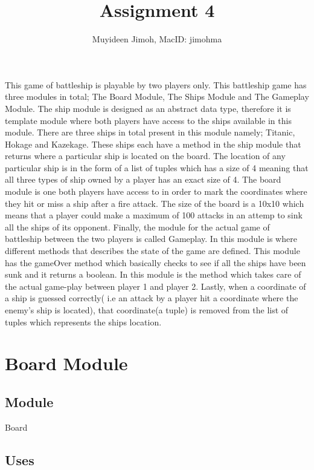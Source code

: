 \documentclass[12pt]{article}
\title{Assignment 4}
\author{Muyideen Jimoh, MacID: jimohma}
\begin{document}
\maketitle

This game of battleship is playable by two players only.  This battleship game has three modules in total; The Board Module, The Ships Module and The Gameplay Module. The ship module is designed as an abstract data type, therefore it is template module where both players have access to the ships available in this module. There are three ships in total present in this module namely; Titanic, Hokage and Kazekage. These ships each have a method in the ship module that returns where a particular ship is located on the board. The location of any particular ship is in the form of a list of tuples which has a size of 4 meaning that all three types of ship owned by a player has an exact size of 4. The board module is one both players have access to in order to mark the coordinates where they hit or miss a ship after a fire attack. The size of the board is a 10x10 which means that a player could make a maximum of 100 attacks in an attemp to sink all the ships of its opponent. Finally, the module for the actual game of battleship between the two players is called Gameplay. In this module is where different methods that describes the state of the game are defined. This module has the gameOver method which basically checks to see if all the ships have been sunk and it returns a boolean. In this module is the method which takes care of the actual game-play between player 1 and player 2. Lastly, when a coordinate of a ship is guessed correctly( i.e an attack by a player hit a coordinate where the enemy's ship is located), that coordinate(a tuple) is removed from the list of tuples which represents the ships location.


\newpage

\section* {Board Module}

\subsection*{Module}

Board

\subsection* {Uses}
\end{document}
